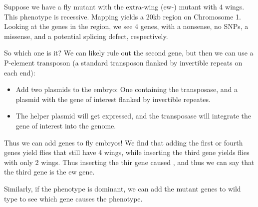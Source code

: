 \begin{exper}
	Suppose we have a fly mutant with the extra-wing (ew\tss-) mutant with 4 wings. This phenotype is recessive.
	Mapping yields a 20kb region on Chromosome 1.
	Looking at the genes in the region, we see 4 genes, with a nonsense, no SNPs, a missense, and a potential splicing defect, respectively.
	
	So which one is it? We can likely rule out the second gene, but then we can use a P-element transposon (a standard transposon flanked by invertible repeats on each end):
	\begin{itemize}
		\item Add two plasmids to the embryo: One  containing the transposase, and a plasmid with the gene of interest flanked by invertible repeates.
		\item The helper plasmid will get expressed, and the transposase will integrate the gene of interest into the genome.
	\end{itemize}
	Thus we can add genes to fly embryos! We find that adding the first or fourth genes yield flies that still have 4 wings, while inserting the third gene yields flies with only 2 wings. Thus inserting the thir gene caused ,
	and thus we can say that the third gene is the ew gene.

	Similarly, if the phenotype is dominant, we can add the mutant genes to wild type to see which gene causes the phenotype.
\end{exper}	
